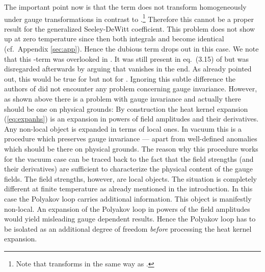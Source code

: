 \documentclass[a4paper,showpacs,showkeys,prd,nofootinbib]{revtex4}
\begin{document}
The important point now is that the term \coordHE{} does not transform homogeneously
under gauge transformations in contrast to \coordHE{}.\footnote{Note that \coordHE{} 
transforms in the same way as \coordHE{}.} Therefore
this cannot be a proper result for the generalized Seeley-DeWitt coefficient. This
problem does not show up at zero temperature since then both integrals \coordHE{} and
\coordHE{} become identical (cf.~Appendix \ref{sec:app}). 
Hence the dubious term drops out in this case. We note
that this \coordHE{}-term was overlooked in \cite{Boschi-Filho:1992ah}. It was still present in
eq.~(3.15) of \cite{Boschi-Filho:1992ah} but was disregarded afterwards by arguing that \coordHE{}
vanishes in the end. As already pointed out, this would be true for \myHighlight{$[D_0,f]$}\coordHE{} but
not for \coordHE{}. Ignoring this subtle difference the authors of \cite{Boschi-Filho:1992ah} did
not encounter any problem concerning gauge invariance. However, as shown above there is 
a problem with gauge invariance and actually there should be one on physical grounds:
By construction the heat kernel expansion (\ref{eq:expanhs}) is an expansion
in powers of field amplitudes and their derivatives. Any non-local object is 
expanded in terms of local ones. In vacuum this is a procedure which preserves gauge 
invariance --- apart from well-defined anomalies which should be there on physical
grounds. The reason why this procedure works for the vacuum case can be traced back
to the fact that the field strengths (and their derivatives) are sufficient to 
characterize the physical content of the gauge fields. The field strengths, however,
are local objects. The situation is completely different at finite temperature
as already mentioned in the introduction. In this case the Polyakov loop carries
additional information. This object is manifestly non-local. An expansion of the
Polyakov loop in powers of the field amplitudes would yield misleading gauge dependent
results. Hence the Polyakov loop has to be isolated as an additional degree of freedom
{\em before} processing the heat kernel expansion.
\end{document}
